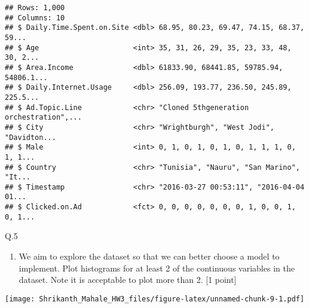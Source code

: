 \documentclass[]{article}
\newenvironment{Shaded}{\begin{snugshade}}{\end{snugshade}}
\newcommand{\KeywordTok}[1]{\textcolor[rgb]{0.13,0.29,0.53}{\textbf{#1}}}
\newcommand{\DataTypeTok}[1]{\textcolor[rgb]{0.13,0.29,0.53}{#1}}
\newcommand{\StringTok}[1]{\textcolor[rgb]{0.31,0.60,0.02}{#1}}
\newcommand{\CommentTok}[1]{\textcolor[rgb]{0.56,0.35,0.01}{\textit{#1}}}
\newcommand{\OperatorTok}[1]{\textcolor[rgb]{0.81,0.36,0.00}{\textbf{#1}}}
\newcommand{\NormalTok}[1]{#1}
\providecommand{\tightlist}{%
  \setlength{\itemsep}{0pt}\setlength{\parskip}{0pt}}
\begin{document}
\begin{Shaded}
\end{Shaded}

\begin{verbatim}
## Rows: 1,000
## Columns: 10
## $ Daily.Time.Spent.on.Site <dbl> 68.95, 80.23, 69.47, 74.15, 68.37, 59...
## $ Age                      <int> 35, 31, 26, 29, 35, 23, 33, 48, 30, 2...
## $ Area.Income              <dbl> 61833.90, 68441.85, 59785.94, 54806.1...
## $ Daily.Internet.Usage     <dbl> 256.09, 193.77, 236.50, 245.89, 225.5...
## $ Ad.Topic.Line            <chr> "Cloned 5thgeneration orchestration",...
## $ City                     <chr> "Wrightburgh", "West Jodi", "Davidton...
## $ Male                     <int> 0, 1, 0, 1, 0, 1, 0, 1, 1, 1, 0, 1, 1...
## $ Country                  <chr> "Tunisia", "Nauru", "San Marino", "It...
## $ Timestamp                <chr> "2016-03-27 00:53:11", "2016-04-04 01...
## $ Clicked.on.Ad            <fct> 0, 0, 0, 0, 0, 0, 0, 1, 0, 0, 1, 0, 1...
\end{verbatim}

Q.5

\begin{enumerate}
\def\labelenumi{\alph{enumi})}
\tightlist
\item
  We aim to explore the dataset so that we can better choose a model to
  implement. Plot histograms for at least 2 of the continuous variables
  in the dataset. Note it is acceptable to plot more than 2. {[}1
  point{]}
\end{enumerate}

\begin{Shaded}
\end{Shaded}

\texttt{[image: Shrikanth\_Mahale\_HW3\_files/figure-latex/unnamed-chunk-9-1.pdf]}

\begin{Shaded}
\end{Shaded}
\end{document}
